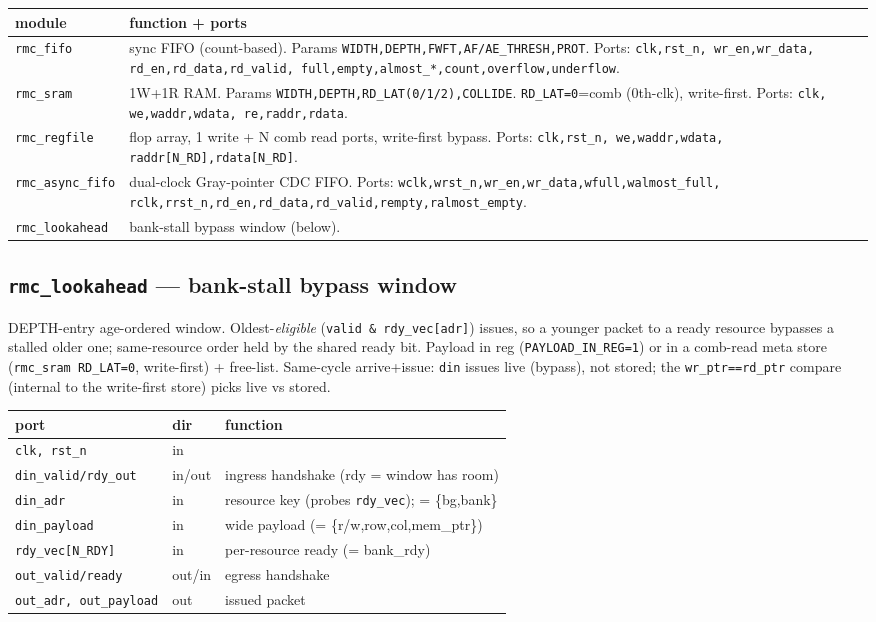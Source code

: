 \documentclass[10pt]{article}
\newcommand{\sig}[1]{\texttt{\small #1}}
\newcommand{\blk}[1]{\textbf{#1}}
\begin{document}
\begin{longtable}{P{3.0cm} P{12.0cm}}
\toprule \blk{module} & \blk{function + ports}\\ \midrule \endhead
\sig{rmc_fifo} & sync FIFO (count-based). Params \sig{WIDTH,DEPTH,FWFT,AF/AE_THRESH,PROT}.
Ports: \sig{clk,rst_n, wr_en,wr_data, rd_en,rd_data,rd_valid, full,empty,almost_*,count,overflow,underflow}.\\
\sig{rmc_sram} & 1W+1R RAM. Params \sig{WIDTH,DEPTH,RD_LAT(0/1/2),COLLIDE}. \sig{RD_LAT=0}=comb (0th-clk),
write-first. Ports: \sig{clk, we,waddr,wdata, re,raddr,rdata}.\\
\sig{rmc_regfile} & flop array, 1 write + N comb read ports, write-first bypass. Ports:
\sig{clk,rst_n, we,waddr,wdata, raddr[N_RD],rdata[N_RD]}.\\
\sig{rmc_async_fifo} & dual-clock Gray-pointer CDC FIFO. Ports: \sig{wclk,wrst_n,wr_en,wr_data,wfull,walmost_full,
rclk,rrst_n,rd_en,rd_data,rd_valid,rempty,ralmost_empty}.\\
\sig{rmc_lookahead} & bank-stall bypass window (below).\\
\bottomrule
\end{longtable}

\subsection{\texttt{rmc\_lookahead} --- bank-stall bypass window}
DEPTH-entry age-ordered window. Oldest-\emph{eligible} (\sig{valid \& rdy_vec[adr]}) issues, so a
younger packet to a ready resource bypasses a stalled older one; same-resource order held by the
shared ready bit. Payload in reg (\sig{PAYLOAD_IN_REG=1}) or in a comb-read meta store
(\sig{rmc_sram RD_LAT=0}, write-first) + free-list. Same-cycle arrive+issue: \sig{din} issues live
(bypass), not stored; the \sig{wr_ptr==rd_ptr} compare (internal to the write-first store) picks live
vs stored.
\begin{longtable}{P{3.2cm} P{1.3cm} P{9.8cm}}
\toprule \blk{port} & \blk{dir} & \blk{function}\\ \midrule \endhead
\sig{clk, rst_n} & in & \\
\sig{din_valid/rdy_out} & in/out & ingress handshake (rdy = window has room)\\
\sig{din_adr} & in & resource key (probes \sig{rdy_vec}); = \{bg,bank\}\\
\sig{din_payload} & in & wide payload (= \{r/w,row,col,mem\_ptr\})\\
\sig{rdy_vec[N_RDY]} & in & per-resource ready (= bank\_rdy)\\
\sig{out_valid/ready} & out/in & egress handshake\\
\sig{out_adr, out_payload} & out & issued packet\\
\bottomrule
\end{longtable}
\end{document}
